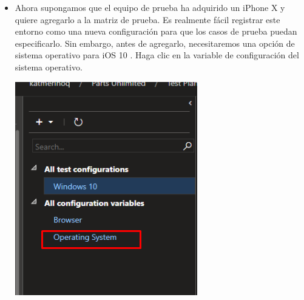 \begin{itemize}
\item Ahora supongamos que el equipo de prueba ha adquirido un iPhone X y quiere agregarlo a la matriz de prueba. Es realmente fácil registrar este entorno como una nueva configuración para que los casos de prueba puedan especificarlo. Sin embargo, antes de agregarlo, necesitaremos una opción de sistema operativo para iOS 10 . Haga clic en la variable de configuración del sistema operativo.
\begin{center}
\includegraphics[width=\columnwidth]{images/43}\newline
\end{center}


\end{itemize}
